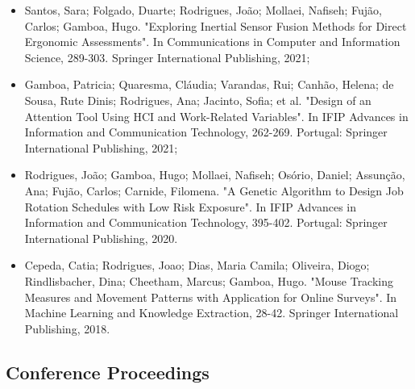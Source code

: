 \begin{itemize}
\item Santos, Sara; Folgado, Duarte; Rodrigues, João; Mollaei, Nafiseh; Fujão, Carlos; Gamboa, Hugo. "Exploring Inertial Sensor Fusion Methods for Direct Ergonomic Assessments". In Communications in Computer and Information Science, 289-303. Springer International Publishing, 2021;

\item Gamboa, Patricia; Quaresma, Cláudia; Varandas, Rui; Canhão, Helena; de Sousa, Rute Dinis; Rodrigues, Ana; Jacinto, Sofia; et al. "Design of an Attention Tool Using HCI and Work-Related Variables". In IFIP Advances in Information and Communication Technology, 262-269. Portugal: Springer International Publishing, 2021;

\item Rodrigues, João; Gamboa, Hugo; Mollaei, Nafiseh; Osório, Daniel; Assunção, Ana; Fujão, Carlos; Carnide, Filomena. "A Genetic Algorithm to Design Job Rotation Schedules with Low Risk Exposure". In IFIP Advances in Information and Communication Technology, 395-402. Portugal: Springer International Publishing, 2020.

\item Cepeda, Catia; Rodrigues, Joao; Dias, Maria Camila; Oliveira, Diogo; Rindlisbacher, Dina; Cheetham, Marcus; Gamboa, Hugo. "Mouse Tracking Measures and Movement Patterns with Application for Online Surveys". In Machine Learning and Knowledge Extraction, 28-42. Springer International Publishing, 2018.

\end{itemize}


\subsection{Conference Proceedings}

